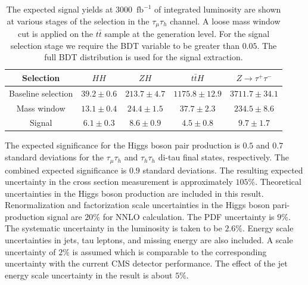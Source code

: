 \begin{table}[!ht]
\begin{center} 
\begin{tabular}{|c|c|c|c|c|}
\hline
Selection  & $HH$ & $ZH$ & $t\bar{t}H$ & $Z\rightarrow \tau^{+}\tau^{-}$  \\  \hline 
Baseline selection & $39.2\pm0.6$ & $213.7\pm4.7$ & $1175.8\pm12.9$ & $3711.7\pm34.1$  \\
Mass window  & $13.1\pm0.4$ & $24.4\pm1.5$ & $37.7\pm2.3$ & $234.5\pm8.6$  \\ 
Signal  & $6.1\pm0.3$ & $8.6\pm0.9$ & $4.5\pm0.8$ & $9.7\pm1.7$ \\ \hline
\end{tabular}

\vspace{2mm}
\caption{ The expected signal yields at $3000$~$\mathrm{fb}^{-1}$ of integrated luminosity are shown at various stages of the selection in the $\tau_{\mu}\tau_{h}$ channel. A loose mass window cut is applied on the $t\bar{t}$ sample at the generation level. For the signal selection stage we require the BDT variable to be greater than $0.05$. The full BDT distribution is used for the signal extraction.}
\label{tab:mhsig}
\end{center}
\end{table}

The expected significance for the Higgs boson pair production is $0.5$ and $0.7$ standard deviations for the $\tau_{\mu}\tau_{h}$ and $\tau_{h}\tau_{h}$ di-tau final states, respectively. The combined expected significance is $0.9$ standard deviations. The resulting expected uncertainty in the cross section measurement is approximately $105\%$. Theoretical uncertainties in the Higgs boson production are
included in this result. Renormalization and factorization scale
uncertainties in the Higgs boson pari-production signal are $20\%$ for NNLO
calculation. The PDF uncertainty is $9\%$. The systematic uncertainty in
the luminosity is taken to be $2.6\%$. Energy scale uncertainties in jets, tau leptons, and missing energy are also included. A scale uncertainty of $2\%$ is assumed which is comparable to the corresponding uncertainty with the current CMS detector performance. The effect of the jet energy scale uncertainty in the result is about $5\%$.       

